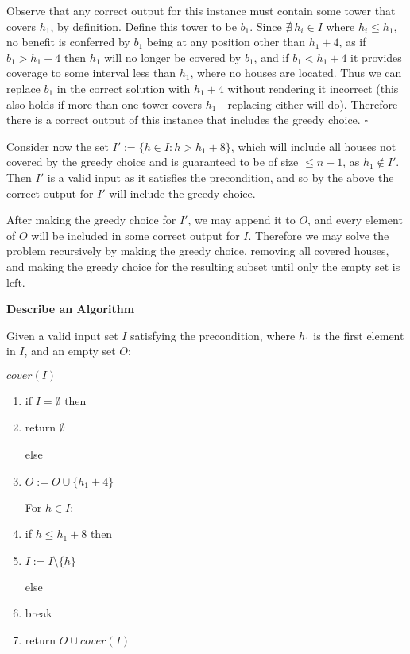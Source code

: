 \documentclass{article}
\begin{document}
Observe that any correct output for this instance must contain some tower that
covers $h_1$, by definition. Define this tower to be $b_1$. Since $\nexists \:
h_i \in I$ where $h_i \leq h_1$, no benefit is conferred by $b_1$ being at any
position other than $h_1+4$, as if $b_1 > h_1+4$ then $h_1$ will no longer be
covered by $b_1$, and if $b_1 < h_1+4$ it provides coverage to some interval
less than $h_1$, where no houses are located. Thus we can replace $b_1$ in the
correct solution with $h_1+4$ without rendering it incorrect (this also holds
if more than one tower covers $h_1$ - replacing either will do). Therefore there
is a correct output of this instance that includes the greedy choice. $\square$

Consider now the set $I':= \{h \in I : h > h_1+8\}$, which will
include all houses not covered by the greedy choice and is guaranteed to be of
size $\leq n-1$, as $h_1 \notin I'$. Then $I'$ is a valid input as it satisfies
the precondition, and so by the above the correct output for $I'$ will include
the greedy choice.

After making the greedy choice for $I'$, we may append it to $O$, and every
element of $O$ will be included in some correct output for $I$. Therefore we may
solve the problem recursively by making the greedy choice, removing all covered
houses, and making the greedy choice for the resulting subset until only the
empty set is left.

\textbf{Describe an Algorithm}

Given a valid input set $I$ satisfying the precondition, where $h_1$ is the
first element in $I$, and an empty set $O$:


\textbf{$cover(I)$}
\begin{enumerate}
\item if $I = \emptyset$ then

\item return $\emptyset$

else

\item $O := O \cup \{h_1 + 4\}$

For $h \in I$:

\item if $h \leq h_1+8$ then

\item $I:= I \setminus \{h\}$

else

\item break

\item return $O \cup cover(I)$
\end{enumerate}
\end{document}
